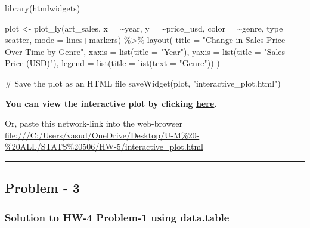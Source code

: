 \documentclass[
  12pt,
]{article}
\newenvironment{Shaded}{\begin{snugshade}}{\end{snugshade}}
\newcommand{\AttributeTok}[1]{\textcolor[rgb]{0.40,0.45,0.13}{#1}}
\newcommand{\CommentTok}[1]{\textcolor[rgb]{0.37,0.37,0.37}{#1}}
\newcommand{\FunctionTok}[1]{\textcolor[rgb]{0.28,0.35,0.67}{#1}}
\newcommand{\NormalTok}[1]{\textcolor[rgb]{0.00,0.23,0.31}{#1}}
\newcommand{\OtherTok}[1]{\textcolor[rgb]{0.00,0.23,0.31}{#1}}
\newcommand{\SpecialCharTok}[1]{\textcolor[rgb]{0.37,0.37,0.37}{#1}}
\newcommand{\StringTok}[1]{\textcolor[rgb]{0.13,0.47,0.30}{#1}}
\begin{document}
\begin{Shaded}
\begin{Highlighting}[]
\FunctionTok{library}\NormalTok{(htmlwidgets)}
  
\NormalTok{plot }\OtherTok{\textless{}{-}} \FunctionTok{plot\_ly}\NormalTok{(art\_sales, }\AttributeTok{x =} \SpecialCharTok{\textasciitilde{}}\NormalTok{year, }\AttributeTok{y =} \SpecialCharTok{\textasciitilde{}}\NormalTok{price\_usd, }\AttributeTok{color =} \SpecialCharTok{\textasciitilde{}}\NormalTok{genre, }
                \AttributeTok{type =} \StringTok{\textquotesingle{}scatter\textquotesingle{}}\NormalTok{, }\AttributeTok{mode =} \StringTok{\textquotesingle{}lines+markers\textquotesingle{}}\NormalTok{) }\SpecialCharTok{\%\textgreater{}\%}
  \FunctionTok{layout}\NormalTok{(}
    \AttributeTok{title =} \StringTok{"Change in Sales Price Over Time by Genre"}\NormalTok{,}
    \AttributeTok{xaxis =} \FunctionTok{list}\NormalTok{(}\AttributeTok{title =} \StringTok{"Year"}\NormalTok{),}
    \AttributeTok{yaxis =} \FunctionTok{list}\NormalTok{(}\AttributeTok{title =} \StringTok{"Sales Price (USD)"}\NormalTok{),}
    \AttributeTok{legend =} \FunctionTok{list}\NormalTok{(}\AttributeTok{title =} \FunctionTok{list}\NormalTok{(}\AttributeTok{text =} \StringTok{"Genre"}\NormalTok{))}
\NormalTok{  )}

\CommentTok{\# Save the plot as an HTML file}
\FunctionTok{saveWidget}\NormalTok{(plot, }\StringTok{"interactive\_plot.html"}\NormalTok{)}
\end{Highlighting}
\end{Shaded}

\textbf{You can view the interactive plot by clicking
\href{./interactive_plot.html}{here}.}

Or, paste this network-link into the web-browser
\url{file:///C:/Users/vasud/OneDrive/Desktop/U-M\%20-\%20ALL/STATS\%20506/HW-5/interactive_plot.html}

\hfill\break

\begin{center}\rule{0.5\linewidth}{0.5pt}\end{center}

\subsection{Problem - 3}\label{problem---3}

\subsubsection{Solution to HW-4 Problem-1 using
data.table}\label{solution-to-hw-4-problem-1-using-data.table}
\end{document}
